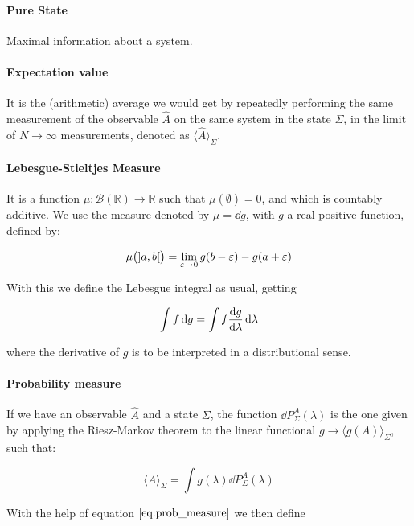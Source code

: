 \documentclass[main.tex]{subfiles}
\begin{document}
\paragraph{Pure State} Maximal information about a system.

\paragraph{Expectation value} It is the (arithmetic) average we would get by repeatedly performing the same measurement of the observable $\hat{A}$ on the same system in the state $\Sigma$, in the limit of $N\rightarrow \infty $ measurements, denoted as $\langle \hat{A} \rangle_\Sigma$.

\paragraph{Lebesgue-Stieltjes Measure} It is a function $\mu: \mathcal{B}(\mathbb{R}) \rightarrow \mathbb{R}$ such that $\mu(\emptyset) = 0$, and which is countably additive. We use the measure denoted by $\mu = \dd{g}$, with $g$ a real positive function, defined by:

\begin{equation}
    \mu\qty(]a, b[) = \lim_{\varepsilon \rightarrow 0} g(b-\varepsilon) - g(a + \varepsilon)
\end{equation}

With this we define the Lebesgue integral as usual, getting

\begin{equation}
    \int f \dd{g} = \int f \dv{g}{\lambda} \dd{\lambda}
\end{equation}

where the derivative of $g$ is to be interpreted in a distributional sense.

\paragraph{Probability measure} If we have an observable $\hat{A}$ and a state $\Sigma$, the function $\dd{P}_\Sigma ^A (\lambda )$ is the one given by applying the Riesz-Markov theorem to the linear functional $g \rightarrow \langle g(A) \rangle _\Sigma$, such that:

\begin{equation}
    \langle A \rangle _\Sigma = \int g(\lambda) \dd{P}_\Sigma ^A (\lambda )
\end{equation}

With the help of equation $\eqref{eq:prob_measure}$ we then define
\end{document}
